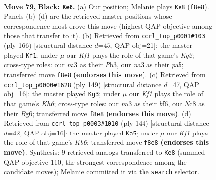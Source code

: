 \documentclass[11pt]{article}
\begin{document}
\clearpage

\begin{figure}[p]\centering
\begin{subfigure}{0.46\textwidth}\centering
\resizebox{\linewidth}{!}{%
\newchessgame
\chessboard[
  setfen={2n2k2/2P4K/p7/P4p1p/4pBb1/N1r3P1/8/R7 b - - 65 79},
  showmover=false,
  pgfstyle=straightmove, color=movearrow, markmove={f8-e8}
]}
\caption{}
\end{subfigure}\hfill
\begin{subfigure}{0.46\textwidth}\centering
\resizebox{\linewidth}{!}{%
\newchessgame
\chessboard[
  setfen={8/2b1k3/5p2/pR3B1p/P3P2P/1Pr5/6K1/8 w - - 3 84},
  showmover=false,
  pgfstyle=straightmove, color=movearrow, markmove={g2-f1}
]}
\caption{}
\end{subfigure}
\\[4pt]
\begin{subfigure}{0.46\textwidth}\centering
\resizebox{\linewidth}{!}{%
\newchessgame
\chessboard[
  setfen={8/7p/2r2Bb1/1p4P1/p7/P6k/1KP2R2/8 b - - 57 75},
  showmover=false,
  pgfstyle=straightmove, color=movearrow, markmove={h3-g3}
]}
\caption{}
\end{subfigure}\hfill
\begin{subfigure}{0.46\textwidth}\centering
\resizebox{\linewidth}{!}{%
\newchessgame
\chessboard[
  setfen={8/4k1p1/1K2P3/7P/1p1r2n1/1Bp3R1/P7/8 w - - 18 73},
  showmover=false,
  pgfstyle=straightmove, color=movearrow, markmove={b6-a5}
]}
\caption{}
\end{subfigure}
\caption{\textbf{Move 79, Black: \texttt{Ke8}.} (a) Our position; Melanie plays \texttt{Ke8} (\texttt{f8e8}). Panels (b)--(d) are the retrieved master positions whose correspondence most drove this move (highest QAP objective among those that transfer to it). (b) Retrieved from \texttt{ccrl\_top\_p0001\#103} (ply 166) [structural distance $d$=45, QAP obj=21]: the master played \texttt{Kf1}; under $\mu$ our \emph{Kf1} plays the role of that game's \emph{Kg2}; cross-type roles: our \emph{n}a3 as their \emph{P}b3, our \emph{n}a3 as their \emph{p}a5; transferred move \texttt{f8e8} \textbf{(endorses this move)}. (c) Retrieved from \texttt{ccrl\_top\_p0000\#1628} (ply 149) [structural distance $d$=47, QAP obj=16]: the master played \texttt{Kg3}; under $\mu$ our \emph{Kf1} plays the role of that game's \emph{Kh6}; cross-type roles: our \emph{n}a3 as their \emph{b}f6, our \emph{N}c8 as their \emph{B}g6; transferred move \texttt{f8e8} \textbf{(endorses this move)}. (d) Retrieved from \texttt{ccrl\_top\_p0003\#1010} (ply 144) [structural distance $d$=42, QAP obj=16]: the master played \texttt{Ka5}; under $\mu$ our \emph{Kf1} plays the role of that game's \emph{Kb6}; transferred move \texttt{f8e8} \textbf{(endorses this move)}. Synthesis: 9 retrieved analogs transferred to \texttt{Ke8} (summed QAP objective 110, the strongest correspondence among the candidate moves); Melanie committed it via the \texttt{search} selector.}
\label{fig:thought-m157}
\end{figure}
\end{document}
